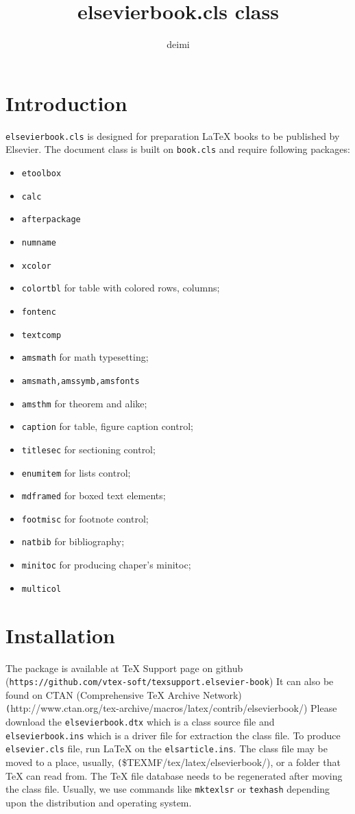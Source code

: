 \documentclass[a4paper,12pt]{article}
\title{elsevierbook.cls class}
\author{deimi}
\date{}
\def\file#1{\texttt{#1}}
\begin{document}
\maketitle

\section{Introduction}

\file{elsevierbook.cls} is designed for preparation \LaTeX{} books to be published by Elsevier. 
The document class is built on \file{book.cls} and require following packages:

\begin{itemize}
\item \file{etoolbox}
\item \file{calc}
\item \file{afterpackage}
\item \file{numname}
\item \file{xcolor}
\item \file{colortbl} for table with colored rows, columns;
\item \file{fontenc}
\item \file{textcomp} 
\item \file{amsmath} for math typesetting;
\item \file{amsmath,amssymb,amsfonts}
\item \file{amsthm} for theorem and alike;
\item \file{caption} for table, figure caption control;
\item \file{titlesec} for sectioning control;
\item \file{enumitem} for lists control;
\item \file{mdframed} for boxed text elements;
\item \file{footmisc} for footnote control;
\item \file{natbib} for bibliography; 
\item \file{minitoc} for producing chaper's minitoc;
\item \file{multicol}
\end{itemize}

\section{Installation}


The package is available at TeX Support page on github\\ (\file{https://github.com/vtex-soft/texsupport.elsevier-book})
It can also be found on CTAN (Comprehensive TeX Archive Network)
\file(http://www.ctan.org/tex-archive/macros/latex/contrib/elsevierbook/)
Please download the \file{elsevierbook.dtx} which is a class source file and
\file{elsevierbook.ins} which is a driver file for extraction the class file.
To produce \file{elsevier.cls} file, run LaTeX on the \file{elsarticle.ins}. 
The class file may be moved to a place, usually, \file(\$TEXMF/tex/latex/elsevierbook/), or a folder
that TeX can read  from. The TeX file database needs to be regenerated after moving the class file.
Usually, we use commands like \file{mktexlsr} or \file{texhash} depending upon the distribution and operating system. 
\end{document}
